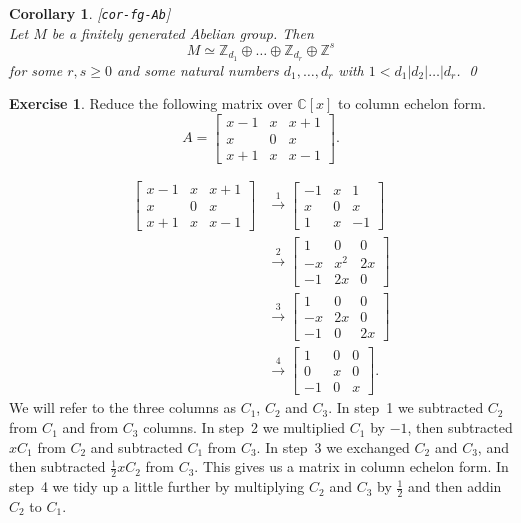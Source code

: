 \documentclass{amsart}
\newcommand{\lbl}[1]{\label{#1}\textup{[\texttt{#1}]}\ \\}
\newcommand{\lbl}{\label}
\newcommand{\bbm}       {\left[\begin{matrix}}
\newcommand{\ebm}       {\end{matrix}\right]}
\newcommand{\C}         {{\mathbb{C}}}
\newcommand{\Z}         {{\mathbb{Z}}}
\newcommand{\xra}       {\xrightarrow}
\newcommand{\ip}[1]     {\langle #1\rangle}
\newcommand{\op}        {\oplus}
\newcommand{\half}      {{\textstyle\frac{1}{2}}}
\renewcommand{\:}{\colon}
\newtheorem{corollary}[theorem]{Corollary}
\theoremstyle{definition}
\newtheorem{exercise}{Exercise}[section]
\renewenvironment{solution}{\SolutionAtEnd}{\endSolutionAtEnd}
\begin{document}
\begin{corollary}\lbl{cor-fg-Ab}
 Let $M$ be a finitely generated Abelian group.  Then
 \[ M\simeq \Z_{d_1}\op\ldots\op\Z_{d_r}\op \Z^s \]
 for some $r,s\geq 0$ and some natural numbers $d_1,\ldots,d_r$ with
 $1<d_1|d_2|\ldots|d_r$. \qed
\end{corollary}


\begin{exercise}
 Reduce the following matrix over $\C[x]$ to column echelon form.
 \[ A = \bbm x-1 & x & x+1 \\ x & 0 & x \\ x+1 & x & x-1 \ebm. \]
\end{exercise}
\begin{solution}
 \begin{align*}
   \bbm x-1 & x & x+1 \\ x & 0 & x \\ x+1 & x & x-1 \ebm 
   &\xra{1} \bbm -1 & x & 1 \\ x & 0 & x \\ 1 & x & -1 \ebm \\
   &\xra{2} \bbm 1 & 0 & 0 \\ -x & x^2 & 2x \\ -1 & 2x & 0 \ebm \\
   &\xra{3} \bbm 1 & 0 & 0 \\ -x & 2x & 0 \\ -1 & 0 & 2x \ebm \\
   &\xra{4} \bbm 1 & 0 & 0 \\ 0 & x & 0 \\ -1 & 0 & x \ebm.
 \end{align*}
 We will refer to the three columns as $C_1$, $C_2$ and $C_3$.  In
 step~1 we subtracted $C_2$ from $C_1$ and from $C_3$ columns.  In
 step~2 we multiplied $C_1$ by $-1$, then subtracted $xC_1$ from $C_2$
 and subtracted $C_1$ from $C_3$.  In step~3 we exchanged $C_2$ and
 $C_3$, and then subtracted $\half x C_2$ from $C_3$.  This gives us a
 matrix in column echelon form.  In step~4 we tidy up a little further
 by multiplying $C_2$ and $C_3$ by $\half$ and then addin $C_2$ to
 $C_1$. 
\end{solution}
\end{document}
